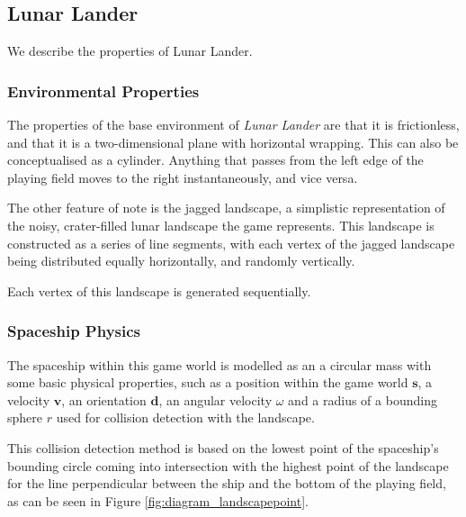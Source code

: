 \documentclass[conference]{IEEEtran}
\begin{document}
\subsection{Lunar Lander}
We describe the properties of Lunar Lander. 

\subsubsection{Environmental Properties}

The properties of the base environment of {\itshape Lunar Lander} are that it is frictionless, and that it is a two-dimensional plane with horizontal wrapping. This can also be conceptualised as a cylinder. Anything that passes from the left edge of the playing field moves to the right instantaneously, and vice versa.

The other feature of note is the jagged landscape, a simplistic representation of the noisy, crater-filled lunar landscape the game represents. This landscape is constructed as a series of line segments, with each vertex of the jagged landscape being distributed equally horizontally, and randomly vertically. %



Each vertex of this landscape is generated sequentially. %


\subsubsection{Spaceship Physics}

The spaceship within this game world is modelled as an a circular mass with some basic physical properties, such as a position within the game world $\bm {s}$, a velocity $\bm {v}$, an orientation $\bm{d}$, an angular velocity $\omega$ and a radius of a bounding sphere $r$ used for collision detection with the landscape.

This collision detection method is based on the lowest point of the spaceship's bounding circle coming into intersection with the highest point of the landscape for the line perpendicular between the ship and the bottom of the playing field, as can be seen in Figure \ref{fig:diagram_landscapepoint}.
\end{document}
